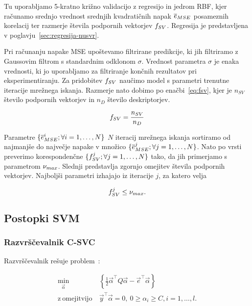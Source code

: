 {Tu uporabljamo 5-kratno križno validacijo z regresijo \nusvr in jedrom RBF, kjer računamo srednjo vrednost srednjih kvadratičnih napak $\overline{e}_{MSE}$ posameznih korelacij ter razmerje števila podpornih vektorjev $f_{SV}$. Regresija \nusvr je predstavljena v poglavju~\ref{sec:regresija-nusvr}.

Pri računanju napake MSE upoštevamo filtrirane predikcije, ki jih filtriramo z Gaussovim filtrom s standardnim odklonom $\sigma$. Vrednost parametra $\sigma$ je enaka vrednosti, ki jo uporabljamo za filtriranje končnih rezultatov pri eksperimentiranju. Za pridobitev $f_{SV}$ naučimo model s parametri trenutne iteracije mrežnega iskanja. Razmerje nato dobimo po enačbi~\eqref{eq:fsv}, kjer je $n_{SV}$ število podpornih vektorjev in $n_{D}$ število deskriptorjev.

\begin{equation}
f_{SV} = \frac{n_{SV}}{n_{D}}
\label{eq:fsv}
\end{equation}

Parametre $\{\overline{e}_{MSE}^{i};\forall i=1,\ldots,N\}$ $N$ iteracij mrežnega iskanja sortiramo od najmanjše do največje napake v množico $\{\overline{e}_{MSE}^{j};\forall j=1,\ldots,N\}$. Nato po vrsti preverimo korespondenčne $\{f_{SV}^{j};\forall j=1,\ldots,N\}$ tako, da jih primerjamo s parametrom $\nu_{max}$. Slednji predstavlja zgornjo omejitev števila podpornih vektorjev. Najboljši parametri izhajajo iz iteracije $j$, za katero velja 

\begin{equation}
f_{SV}^{j} \leq \nu_{max}.
\label{eq:numax}
\end{equation}


\subsection{Postopki SVM}
\subsubsection{Razvrščevalnik C-SVC}

Razvrščevalnik rešuje problem~\cite{chang2011a}:

\begin{equation}\label{eq:c-svc}
\begin{aligned}
\min_{\vec{\alpha}} &~ \left\{ \frac{1}{2} \vec{\alpha}^\top Q \vec{\alpha} - \vec{e}^\top \vec{\alpha} \right\}\\
    \mathrm{z~omejitvijo} &~ \vec{y}^\top \vec{\alpha} = 0,~ 
    0 \geq \alpha_i \geq C, i=1, \ldots, l.
\end{aligned}	
\end{equation}

}
